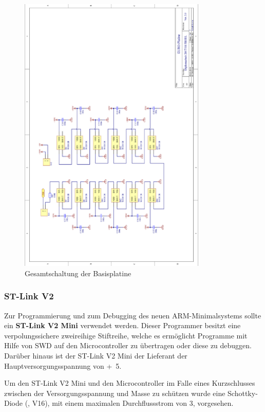 \begin{figure}[htb]\ContinuedFloat
    \centering
    \includegraphics[width=0.8\textwidth]{Schuh/Pictures/Basis-Schaltung7}
    \caption[Gesamtschaltung der Basisplatine]{Gesamtschaltung der \gls{Basisplatine}}
\end{figure}

\subsubsection{ST-Link V2}
\label{sec:basisplatine-stlink}
Zur Programmierung und zum \gls{Debugging} des neuen \gls{ARM}-\gls{Minimalsystem}s sollte ein \textbf{ST-Link V2 Mini} verwendet werden. Dieser Programmer besitzt eine verpolungssichere zweireihige Stiftreihe, welche es ermöglicht Programme mit Hilfe von \gls{SWD} auf den Microcontroller zu übertragen oder diese zu debuggen. Darüber hinaus ist der ST-Link V2 Mini der Lieferant der Hauptversorgungsspannung von \unit{+5}{\volt}.

Um den ST-Link V2 Mini und den Microcontroller im Falle eines Kurzschlusses zwischen der Versorgungsspannung und Masse zu schützen wurde eine Schottky-Diode (, V16), mit einem maximalen Durchflussstrom von \unit{3}{\ampere}, vorgesehen.

